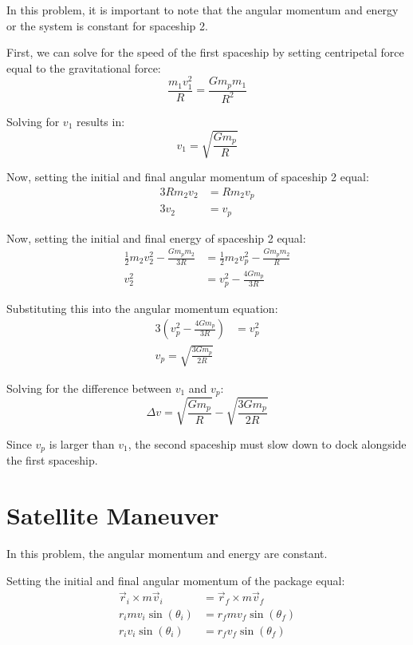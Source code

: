 \documentclass{article}
\begin{document}
In this problem, it is important to note that the angular momentum and energy or
the system is constant for spaceship 2.

First, we can solve for the speed of the first spaceship by setting centripetal
force equal to the gravitational force:
$$\frac{m_1 v_1^2}{R} = \frac{G m_p m_1}{R^2}$$

Solving for $v_1$ results in:
$$v_1 = \sqrt{ \frac{G m_p}{R} }$$

Now, setting the initial and final angular momentum of spaceship 2 equal:
\begin{align*}
    3 R m_2 v_2 &= R m_2 v_p \\
    3 v_2 &= v_p
\end{align*}

Now, setting the initial and final energy of spaceship 2 equal:
\begin{align*}
    \frac{1}{2} m_2 v_2^2 - \frac{G m_p m_2}{3 R} &= \frac{1}{2} m_2 v_p^2 -
    \frac{G m_p m_2}{R} \\
    v_2^2 &= v_p^2 - \frac{4 G m_p}{3 R}
\end{align*}

Substituting this into the angular momentum equation:
\begin{align*}
    3 \left( v_p^2 - \frac{4 G m_p}{3 R} \right) &= v_p^2 \\
    v_p = \sqrt{ \frac{3 G m_p}{2R} }
\end{align*}

Solving for the difference between $v_1$ and $v_p$:
$$\Delta v = \sqrt{ \frac{G m_p}{R} } - \sqrt{ \frac{3 G m_p}{2R} }$$

Since $v_p$ is larger than $v_1$, the second spaceship must slow down to dock
alongside the first spaceship.

\section{Satellite Maneuver}

In this problem, the angular momentum and energy are constant.

Setting the initial and final angular momentum of the package equal:
\begin{align*}
    \vec{r}_i \times m \vec{v}_i &= \vec{r}_f \times m \vec{v}_f \\
    r_i m v_i \sin(\theta_i) &= r_f m v_f \sin(\theta_f) \\
    r_i v_i \sin(\theta_i) &= r_f v_f \sin(\theta_f)
\end{align*}
\end{document}
